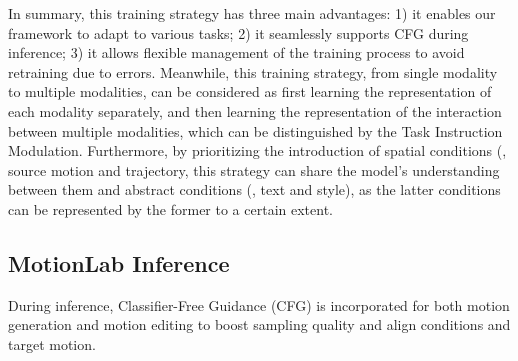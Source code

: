 
In summary, this training strategy has three main advantages: 1) it enables our framework to adapt to various tasks; 2) it seamlessly supports CFG during inference; 3) it allows flexible management of the training process to avoid retraining due to errors. Meanwhile, this training strategy, from single modality to multiple modalities, can be considered as first learning the representation of each modality separately, and then learning the representation of the interaction between multiple modalities, which can be distinguished by the Task Instruction Modulation. 
Furthermore, by prioritizing the introduction of spatial conditions (\ie, source motion and trajectory, this strategy can share the model's understanding between them and abstract conditions (\ie, text and style), as the latter conditions can be represented by the former to a certain extent.


\subsection{MotionLab Inference} \label{sec:ucfg}
During inference, Classifier-Free Guidance (CFG) \cite{ho2022classifier} is incorporated for both motion generation and motion editing to boost sampling quality and align conditions and target motion. 

